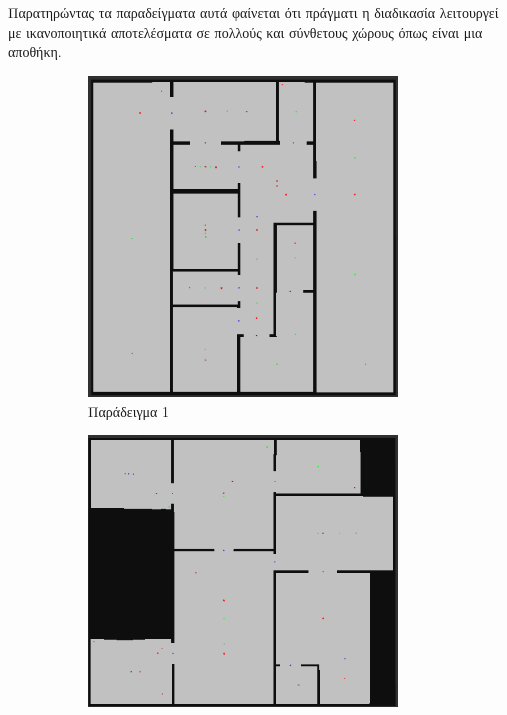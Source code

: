 Παρατηρώντας τα παραδείγματα αυτά φαίνεται ότι πράγματι η διαδικασία λειτουργεί με ικανοποιητικά αποτελέσματα σε πολλούς και σύνθετους χώρους όπως είναι μια αποθήκη.


\begin{figure}[!htb]
    \centering
    \begin{subfigure}{0.5\textwidth}
        \includegraphics[width=0.9\textwidth]{./images/chapter6/b1c86b70b59c42219161174de6500049.png}
        \caption{Παράδειγμα 1}
        \label{fig:room_detection_example_1}
    \end{subfigure}%
    \begin{subfigure}{0.5\textwidth}
        \centering
        \includegraphics[width=0.9\textwidth]{./images/chapter6/fea87120e90bbffd5e8c42e3b6002165.png}

\end{subfigure}
\end{figure}
